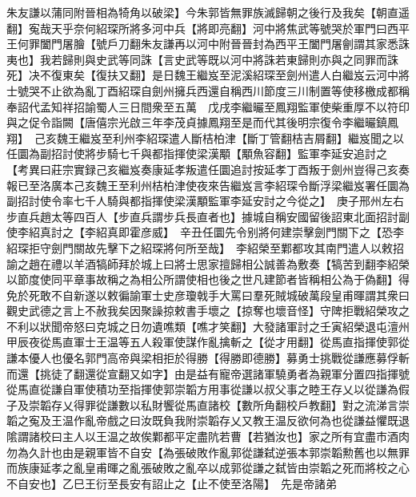 朱友謙以蒲同附晉相為犄角以破梁】今朱郭皆無罪族滅歸朝之後行及我矣【朝直遥翻】寃哉天乎奈何紹琛所將多河中兵【將即亮翻】河中將焦武等號哭於軍門曰西平王何罪闔門屠膾【號戶刀翻朱友謙再以河中附晉晉封為西平王闔門屠劊謂其家悉誅夷也】我若歸則與史武等同誅【言史武等既以河中將誅若東歸則亦與之同罪而誅死】决不復東矣【復扶又翻】是日魏王繼岌至泥溪紹琛至劍州遣人白繼岌云河中將士號哭不止欲為亂丁酉紹琛自劍州擁兵西還自稱西川節度三川制置等使移檄成都稱奉詔代孟知祥招諭蜀人三日間衆至五萬　戊戌李繼曮至鳳翔監軍使柴重厚不以符印與之促令詣闕【唐僖宗光啟三年李茂貞據鳳翔至是而代其後明宗復令李繼曮鎮鳳翔】　己亥魏王繼岌至利州李紹琛遣人斷桔柏津【斷丁管翻桔吉屑翻】繼岌聞之以任圜為副招討使將步騎七千與都指揮使梁漢顒【顒魚容翻】監軍李延安追討之　【考異曰莊宗實録己亥繼岌奏康延孝叛遣任圜追討按延孝丁酉叛于劍州豈得己亥奏報已至洛廣本己亥魏王至利州桔柏津使夜來告繼岌言李紹琛令斷浮梁繼岌署任圜為副招討使令率七千人騎與都指揮使梁漢顒監軍李延安討之今從之】　庚子邢州左右步直兵趙太等四百人【步直兵謂步兵長直者也】據城自稱安國留後詔東北面招討副使李紹真討之【李紹真即霍彦威】　辛丑任圜先令别將何建崇擊劍門關下之【恐李紹琛拒守劍門關故先擊下之紹琛將何所至哉】　李紹榮至鄴都攻其南門遣人以敕招諭之趙在禮以羊酒犒師拜於城上曰將士思家擅歸相公誠善為敷奏【犒苦到翻李紹榮以節度使同平章事故稱之為相公所謂使相也後之世凡建節者皆稱相公為于偽翻】得免於死敢不自新遂以敕徧諭軍士史彦瓊戟手大罵曰羣死賊城破萬段皇甫暉謂其衆曰觀史武德之言上不赦我矣因聚譟掠敕書手壞之【掠奪也壞音怪】守陴拒戰紹榮攻之不利以狀聞帝怒曰克城之日勿遺噍類【噍才笑翻】大發諸軍討之壬寅紹榮退屯澶州　甲辰夜從馬直軍士王温等五人殺軍使謀作亂擒斬之【從才用翻】從馬直指揮使郭從謙本優人也優名郭門高帝與梁相拒於得勝【得勝即德勝】募勇士挑戰從謙應募俘斬而還【挑徒了翻還從宣翻又如字】由是益有寵帝選諸軍驍勇者為親軍分置四指揮號從馬直從謙自軍使積功至指揮使郭崇韜方用事從謙以叔父事之睦王存乂以從謙為假子及崇韜存乂得罪從謙數以私財饗從馬直諸校【數所角翻校戶教翻】對之流涕言崇韜之寃及王温作亂帝戲之曰汝既負我附崇韜存乂又教王温反欲何為也從謙益懼既退隂謂諸校曰主人以王温之故俟鄴都平定盡阬若曹【若猶汝也】家之所有宜盡市酒肉勿為久計也由是親軍皆不自安【為張破敗作亂郭從謙弑逆張本郭崇韜勲舊也以無罪而族康延孝之亂皇甫暉之亂張破敗之亂卒以成郭從謙之弑皆由崇韜之死而將校之心不自安也】乙巳王衍至長安有詔止之【止不使至洛陽】　先是帝諸弟

